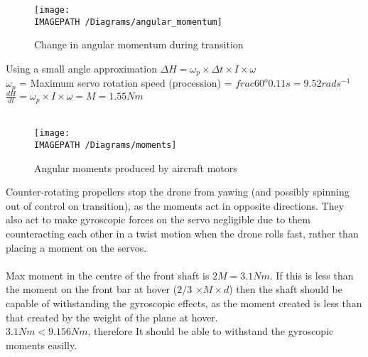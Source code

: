 \begin{figure}[!ht]
	\centering
	\texttt{[image: \\IMAGEPATH /Diagrams/angular\_momentum]}
	\caption{Change in angular momentum during transition}
	\label{fig:momentum}
\end{figure}

Using a small angle approximation $\Delta H = \omega_p \times\Delta t \times I \times \omega$\\ 
$\omega_p$ = Maximum servo rotation speed (procession) = $frac{60^o}{0.11s} = 9.52rads^{-1}$\\
$\frac{dH}{dt} = \omega_p \times I \times \omega = M = 1.55Nm$\\\\

\begin{figure}[!ht]
	\centering
	\texttt{[image: \\IMAGEPATH /Diagrams/moments]}
	\caption{Angular moments produced by aircraft motors}
	\label{fig:moments}
\end{figure}

 Counter-rotating propellers stop the drone from yawing (and possibly spinning out of control on transition), as the moments act in opposite directions. They also act to make gyroscopic forces on the servo negligible due to them counteracting each other in a twist motion when the drone rolls fast, rather than placing a moment on the servos.\\\\
Max moment in the centre of the front shaft is $2M = 3.1Nm$. If this is less than the moment on the front bar at hover ($2/3$ $\times M \times d$) then the shaft should be capable of withstanding the gyroscopic effects, as the moment created is less than that created by the weight of the plane at hover.\\

$3.1Nm < 9.156Nm$, therefore It should be able to withstand the gyroscopic moments easilly.

